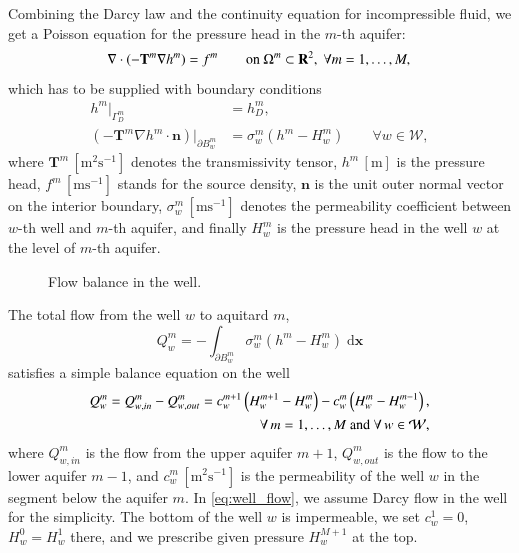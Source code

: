 \documentclass{elsarticle}
\newcommand{\figpath}{../graphics/}
\def\vc#1{\mathbf{\boldsymbol{#1}}}     %
\def\prtl{\partial}
\newcommand{\dd}{\; \mathrm{d}}
\newcommand{\R}{\mathbf{R}}
\newcommand{\bx}{\vc{x}}
\begin{document}
Combining the Darcy law and the continuity equation for incompressible fluid, we get
a Poisson equation for the pressure head in the $m$-th aquifer:
\begin{equation} \label{eqn:poisson}
\nabla\cdot(-\mathbf{T}^m\nabla h^m) = f^m \qquad \textrm{on } \Omega^m\subset\R^2,\; \forall m=1,\dots,M, \\
\end{equation}
which has to be supplied with boundary conditions
\begin{align}
h^m|_{\Gamma^m_D} &= h^m_D, \\
\label{eq:interior_bc}
\left(-\mathbf{T}^m\nabla h^m\cdot\vc{n}\right)|_{\partial B^m_w} &= \sigma^m_w(h^m - H^m_w) \qquad \forall w\in\mathcal{W},
\end{align}
where $\mathbf{T}^m\, [\textrm{m}^2\textrm{s}^{-1}]$ denotes the transmissivity tensor,
$h^m\, [\textrm{m}]$ is the pressure head, $f^m\, [\textrm{m}\textrm{s}^{-1}]$ stands for the source density,
$\vc{n}$ is the unit outer normal vector on the interior boundary,
$\sigma^m_w\, [\textrm{m}\textrm{s}^{-1}]$ denotes the permeability coefficient between $w$-th well and 
$m$-th aquifer, and finally $H_w^m$ is the pressure head in the well $w$ at the level of $m$-th aquifer.
%
\begin{figure}[!htb]
  \begin{center}         
    \def\svgwidth{0.5\textwidth}
    
  \end{center}
  \caption{Flow balance in the well.}
  \label{fig:well_flows}
\end{figure}
%
The total flow from the well $w$ to aquitard $m$,
\[
    Q^m_w =-\int_{\prtl B^m_w} \sigma^m_w(h^m - H^m_w)  \dd\bx
\]
satisfies a simple balance equation on the well
\begin{align}
    \label{eq:well_flow}
    Q_w^m = Q^m_{w,in} - Q^m_{w,out} = c^{m+1}_w\left( H^{m+1}_w-H^m_w \right) - c_w^m\left( H^m_w-H_w^{m-1}\right),&\\
    \notag
    \forall\,m=1,\dots,M\text{ and }\forall\,w\in\mathcal{W},&
\end{align}
where $Q^m_{w,in}$ is the flow from the upper aquifer $m+1$, $Q^m_{w,out}$ is the flow to the lower aquifer $m-1$, and 
$c^m_w\, [\textrm{m}^2\textrm{s}^{-1}]$ is the permeability of the well $w$ in the segment below the aquifer $m$.
%
In \eqref{eq:well_flow}, we assume Darcy flow in the well for the simplicity. The bottom of the well $w$ is impermeable,
we set $c^1_w=0$, $H^0_w=H^1_w$ there, and we prescribe given pressure $H^{M+1}_w$ at the top.
\end{document}
